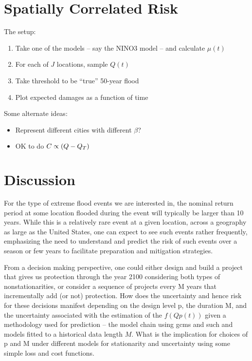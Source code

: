 \documentclass[12pt]{article}
\begin{document}

\section{Spatially Correlated Risk}

The setup:
\begin{enumerate}
  \item Take one of the models -- say the NINO3 model -- and calculate \(\mu(t)\)
  \item For each of \(J\) locations, sample \(Q(t)\)
  \item Take threshold to be ``true'' 50-year flood
  \item Plot expected damages as a function of time
\end{enumerate}
Some alternate ideas:
\begin{itemize}
  \item Represent different cities with different \(\beta\)?
  \item OK to do \(C \propto \qty(Q - Q_T)\)
\end{itemize}


\section{Discussion}

For the type of extreme flood events we are interested in, the nominal return period at some location flooded during the event will typically be larger than 10 years.
While this is a relatively rare event at a given location, across a geography as large as the United States, one can expect to see such events rather frequently, emphasizing the need to understand and predict the risk of such events over a season or few years to facilitate preparation and mitigation strategies.

From a decision making perspective, one could either design and build a project that gives us protection through the year 2100 considering both types of nonstationarities, or consider a sequence of projects every M years that incrementally add (or not) protection. How does the uncertainty and hence risk for these decisions manifest depending on the design level p, the duration M, and the uncertainty associated with the estimation of the \( f(Qp(t)) \) given a methodology used for prediction -- \eg{} the model chain using gcms and such and models fitted to a historical data length \(M\).
What is the implication for choices of p and M under different models for stationarity and uncertainty using some simple loss and cost  functions.
\end{document}
